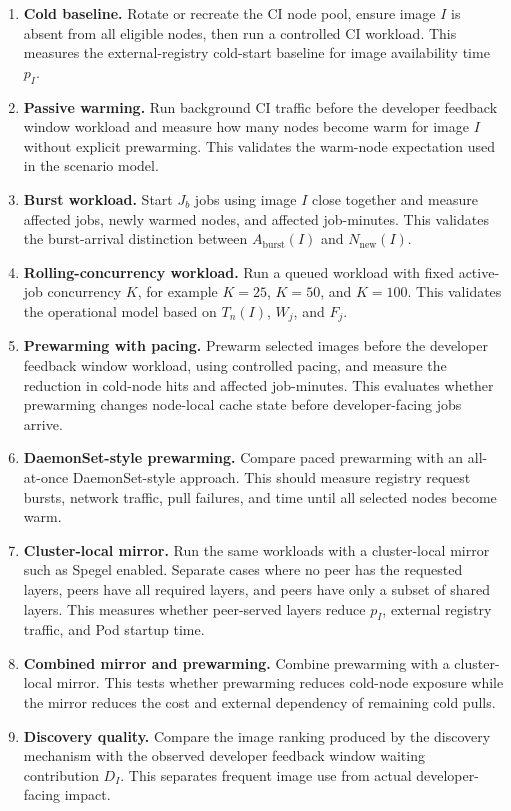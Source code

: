 \documentclass[11pt,a4paper]{article}
\begin{document}
\begin{enumerate}[leftmargin=*]
\item \textbf{Cold baseline.} Rotate or recreate the CI node pool, ensure image \(I\) is absent from all eligible nodes, then run a controlled CI workload. This measures the external-registry cold-start baseline for image availability time \(p_I\).

\item \textbf{Passive warming.} Run background CI traffic before the developer feedback window workload and measure how many nodes become warm for image \(I\) without explicit prewarming. This validates the warm-node expectation used in the scenario model.

\item \textbf{Burst workload.} Start \(J_b\) jobs using image \(I\) close together and measure affected jobs, newly warmed nodes, and affected job-minutes. This validates the burst-arrival distinction between \(A_{\mathrm{burst}}(I)\) and \(N_{\mathrm{new}}(I)\).

\item \textbf{Rolling-concurrency workload.} Run a queued workload with fixed active-job concurrency \(K\), for example \(K=25\), \(K=50\), and \(K=100\). This validates the operational model based on \(T_n(I)\), \(W_j\), and \(F_j\).

\item \textbf{Prewarming with pacing.} Prewarm selected images before the developer feedback window workload, using controlled pacing, and measure the reduction in cold-node hits and affected job-minutes. This evaluates whether prewarming changes node-local cache state before developer-facing jobs arrive.

\item \textbf{DaemonSet-style prewarming.} Compare paced prewarming with an all-at-once DaemonSet-style approach. This should measure registry request bursts, network traffic, pull failures, and time until all selected nodes become warm.

\item \textbf{Cluster-local mirror.} Run the same workloads with a cluster-local mirror such as Spegel enabled. Separate cases where no peer has the requested layers, peers have all required layers, and peers have only a subset of shared layers. This measures whether peer-served layers reduce \(p_I\), external registry traffic, and Pod startup time.

\item \textbf{Combined mirror and prewarming.} Combine prewarming with a cluster-local mirror. This tests whether prewarming reduces cold-node exposure while the mirror reduces the cost and external dependency of remaining cold pulls.

\item \textbf{Discovery quality.} Compare the image ranking produced by the discovery mechanism with the observed developer feedback window waiting contribution \(D_I\). This separates frequent image use from actual developer-facing impact.
\end{enumerate}
\end{document}
